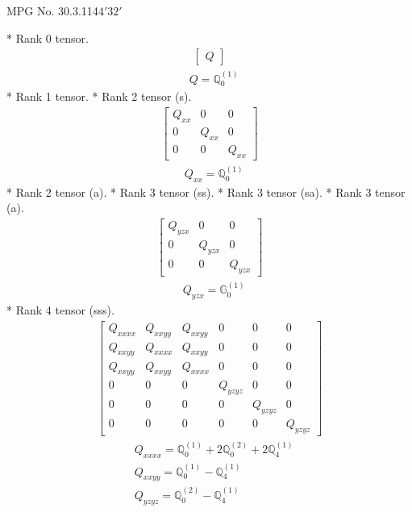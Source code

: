 \documentclass[fleqn,8pt,landscape]{jsarticle}
\begin{document}
\setcounter{MaxMatrixCols}{32}

\renewcommand{\tablename}{Table~}
\renewcommand{\figurename}{Figure~}
\begin{center}
\LARGE
MPG No. 30.3.114\quad$4'32'$
\end{center}
* Rank 0 tensor.
\begin{align*}
\begin{bmatrix} Q \end{bmatrix}
\end{align*}
\begin{align*}
& Q = \mathbb{Q}_{0}^{(1)}
\end{align*}
* Rank 1 tensor.
* Rank 2 tensor (s).
\begin{align*}
\begin{bmatrix} Q_{xx} & 0 & 0 \\ 0 & Q_{xx} & 0 \\ 0 & 0 & Q_{xx} \end{bmatrix}
\end{align*}
\begin{align*}
& Q_{xx} = \mathbb{Q}_{0}^{(1)}
\end{align*}
* Rank 2 tensor (a).
* Rank 3 tensor (ss).
* Rank 3 tensor (sa).
* Rank 3 tensor (a).
\begin{align*}
\begin{bmatrix} Q_{yzx} & 0 & 0 \\ 0 & Q_{yzx} & 0 \\ 0 & 0 & Q_{yzx} \end{bmatrix}
\end{align*}
\begin{align*}
& Q_{yzx} = \mathbb{G}_{0}^{(1)}
\end{align*}
* Rank 4 tensor (sss).
\begin{align*}
\begin{bmatrix} Q_{xxxx} & Q_{xxyy} & Q_{xxyy} & 0 & 0 & 0 \\ Q_{xxyy} & Q_{xxxx} & Q_{xxyy} & 0 & 0 & 0 \\ Q_{xxyy} & Q_{xxyy} & Q_{xxxx} & 0 & 0 & 0 \\ 0 & 0 & 0 & Q_{yzyz} & 0 & 0 \\ 0 & 0 & 0 & 0 & Q_{yzyz} & 0 \\ 0 & 0 & 0 & 0 & 0 & Q_{yzyz} \end{bmatrix}
\end{align*}
\begin{align*}
& Q_{xxxx} = \mathbb{Q}_{0}^{(1)} + 2 \mathbb{Q}_{0}^{(2)} + 2 \mathbb{Q}_{4}^{(1)} \\
& Q_{xxyy} = \mathbb{Q}_{0}^{(1)} - \mathbb{Q}_{4}^{(1)} \\
& Q_{yzyz} = \mathbb{Q}_{0}^{(2)} - \mathbb{Q}_{4}^{(1)}
\end{align*}
\end{document}
